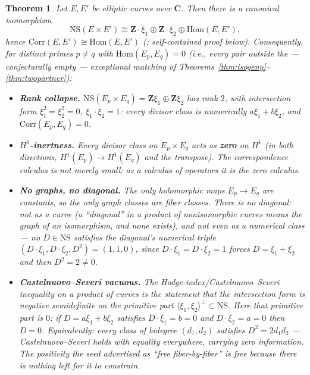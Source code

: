 \documentclass[11pt]{article}
\newtheorem{theorem}{Theorem}
\theoremstyle{definition}
\theoremstyle{remark}
\newcommand{\Z}{\mathbf{Z}}
\newcommand{\C}{\mathbf{C}}
\newcommand{\NS}{\mathrm{NS}}
\newcommand{\Hom}{\mathrm{Hom}}
\newcommand{\Corr}{\mathrm{Corr}}
\begin{document}
\begin{theorem}
\label{thm:NS}
Let $E, E'$ be elliptic curves over $\C$. Then there is a canonical
isomorphism
\[
\NS(E \times E') \cong \Z\cdot\xi_1 \oplus \Z\cdot\xi_2 \oplus \Hom(E, E') ,
\]
hence $\Corr(E, E') \cong \Hom(E, E')$ (\cite[Ch.~5]{BL}; self-contained
proof below). Consequently, for distinct primes $p \neq q$ with
$\Hom(E_p, E_q) = 0$ (i.e., every pair outside the --- conjecturally
empty --- exceptional matching of
Theorems~\ref{thm:isogeny}--\ref{thm:twopartner}):
\begin{itemize}
\item[\textup{(a)}] \textbf{Rank collapse.}
$\NS(E_p \times E_q) = \Z\xi_1 \oplus \Z\xi_2$ has rank $2$, with
intersection form $\xi_1^2 = \xi_2^2 = 0$, $\xi_1\cdot\xi_2 = 1$: every
divisor class is numerically $a\xi_1 + b\xi_2$, and $\Corr(E_p, E_q) = 0$.
\item[\textup{(b)}] \textbf{$H^1$-inertness.} Every divisor class on
$E_p \times E_q$ acts as \textbf{zero} on $H^1$ (in both directions,
$H^1(E_p) \to H^1(E_q)$ and the transpose). The correspondence calculus is
not merely small; as a calculus of operators it is the zero calculus.
\item[\textup{(c)}] \textbf{No graphs, no diagonal.} The only holomorphic
maps $E_p \to E_q$ are constants, so the only graph classes are fiber
classes. There is no diagonal: not as a curve (a ``diagonal'' in a product
of nonisomorphic curves means the graph of an isomorphism, and none exists),
and not even as a numerical class --- no $D \in \NS$ satisfies the
diagonal's numerical triple $(D\cdot\xi_1, D\cdot\xi_2, D^2) = (1, 1, 0)$,
since $D\cdot\xi_1 = D\cdot\xi_2 = 1$ forces $D = \xi_1 + \xi_2$ and then
$D^2 = 2 \neq 0$.
\item[\textup{(d)}] \textbf{Castelnuovo--Severi vacuous.} The
Hodge-index/Castelnuovo--Severi inequality on a product of curves is the
statement that the intersection form is negative semidefinite on the
\emph{primitive} part $\langle \xi_1, \xi_2 \rangle^\perp \subset \NS$. Here
that primitive part is $0$: if $D = a\xi_1 + b\xi_2$ satisfies
$D\cdot\xi_1 = b = 0$ and $D\cdot\xi_2 = a = 0$ then $D = 0$. Equivalently:
every class of bidegree $(d_1, d_2)$ satisfies $D^2 = 2 d_1 d_2$ ---
Castelnuovo--Severi holds \emph{with equality everywhere}, carrying zero
information. The positivity the seed advertised as ``free fiber-by-fiber''
is free because there is nothing left for it to constrain.
\end{itemize}
\end{theorem}
\end{document}
